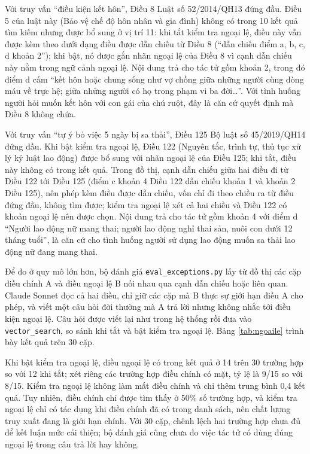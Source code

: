 \documentclass[../DoAn.tex]{subfiles}
\begin{document}
Với truy vấn ``điều kiện kết hôn'', Điều 8 Luật số 52/2014/QH13 đứng đầu. Điều 5 của luật này (Bảo vệ chế độ hôn nhân và gia đình) không có trong 10 kết quả tìm kiếm nhưng được bổ sung ở vị trí 11: khi tắt kiểm tra ngoại lệ, điều này vẫn được kèm theo dưới dạng điều được dẫn chiếu từ Điều 8 (``dẫn chiếu điểm a, b, c, d khoản 2''); khi bật, nó được gắn nhãn ngoại lệ của Điều 8 vì cạnh dẫn chiếu này nằm trong ngữ cảnh ngoại lệ. Nội dung trả cho tác tử gồm khoản 2, trong đó điểm d cấm ``kết hôn hoặc chung sống như vợ chồng giữa những người cùng dòng máu về trực hệ; giữa những người có họ trong phạm vi ba đời\ldots''. Với tình huống người hỏi muốn kết hôn với con gái của chú ruột, đây là căn cứ quyết định mà Điều 8 không chứa.

Với truy vấn ``tự ý bỏ việc 5 ngày bị sa thải'', Điều 125 Bộ luật số 45/2019/QH14 đứng đầu. Khi bật kiểm tra ngoại lệ, Điều 122 (Nguyên tắc, trình tự, thủ tục xử lý kỷ luật lao động) được bổ sung với nhãn ngoại lệ của Điều 125; khi tắt, điều này không có trong kết quả. Trong đồ thị, cạnh dẫn chiếu giữa hai điều đi từ Điều 122 tới Điều 125 (điểm c khoản 4 Điều 122 dẫn chiếu khoản 1 và khoản 2 Điều 125), nên phép kèm điều được dẫn chiếu, vốn chỉ đi theo chiều ra từ điều đứng đầu, không tìm được; kiểm tra ngoại lệ xét cả hai chiều và Điều 122 có khoản ngoại lệ nên được chọn. Nội dung trả cho tác tử gồm khoản 4 với điểm d ``Người lao động nữ mang thai; người lao động nghỉ thai sản, nuôi con dưới 12 tháng tuổi'', là căn cứ cho tình huống người sử dụng lao động muốn sa thải lao động nữ đang mang thai.

Để đo ở quy mô lớn hơn, bộ đánh giá \texttt{eval\_exceptions.py} lấy từ đồ thị các cặp điều chính A và điều ngoại lệ B nối nhau qua cạnh dẫn chiếu hoặc liên quan. Claude Sonnet đọc cả hai điều, chỉ giữ các cặp mà B thực sự giới hạn điều A cho phép, và viết một câu hỏi đời thường mà A trả lời nhưng không nhắc tới điều kiện ngoại lệ. Câu hỏi được viết lại như trong hệ thống rồi đưa vào \texttt{vector\_search}, so sánh khi tắt và bật kiểm tra ngoại lệ. Bảng \ref{tab:ngoaile} trình bày kết quả trên 30 cặp.



Khi bật kiểm tra ngoại lệ, điều ngoại lệ có trong kết quả ở 14 trên 30 trường hợp so với 12 khi tắt; xét riêng các trường hợp điều chính có mặt, tỷ lệ là 9/15 so với 8/15. Kiểm tra ngoại lệ không làm mất điều chính và chỉ thêm trung bình 0,4 kết quả. Tuy nhiên, điều chính chỉ được tìm thấy ở 50\% số trường hợp, và kiểm tra ngoại lệ chỉ có tác dụng khi điều chính đã có trong danh sách, nên chất lượng truy xuất đang là giới hạn chính. Với 30 cặp, chênh lệch hai trường hợp chưa đủ để kết luận mức cải thiện; bộ đánh giá cũng chưa đo việc tác tử có dùng đúng ngoại lệ trong câu trả lời hay không.
\end{document}
